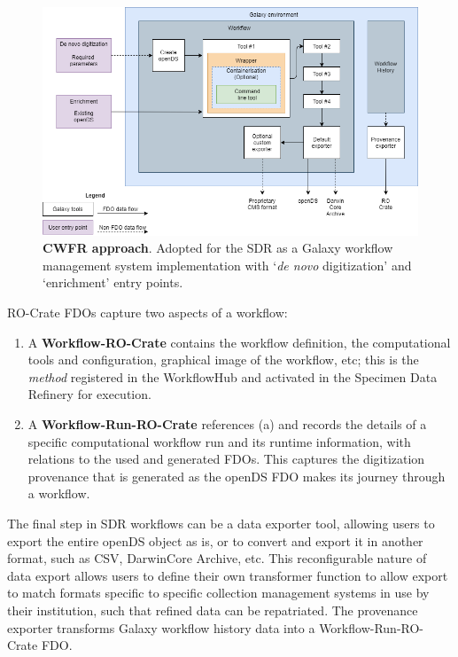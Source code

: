 \begin{figure}%
  \includegraphics[width=\textwidth]{figures/ch08/figure2.png}
	\caption[CWFR approach]{\textbf{CWFR approach}. Adopted for the SDR as a Galaxy 
  workflow management system
  implementation with `\emph{de novo} digitization' and `enrichment' entry points.}
  \label{ch8:figure2}
\end{figure}


RO-Crate FDOs capture two aspects of a workflow:

\begin{enumerate}
\item
  A \textbf{Workflow-RO-Crate} contains the workflow definition, the
  computational tools and configuration, graphical image of the
  workflow, etc; this is the \emph{method} registered in the WorkflowHub
  and activated in the Specimen Data Refinery for execution.
\item
  A \textbf{Workflow-Run-RO-Crate} references (a) and records the
  details of a specific computational workflow run and its runtime
  information, with relations to the used and generated FDOs. This
  captures the digitization provenance that is generated as the openDS
  FDO makes its journey through a workflow.
\end{enumerate}

The final step in SDR workflows can be a data exporter tool, allowing
users to export the entire openDS object as is, or to convert and export
it in another format, such as CSV, DarwinCore Archive, etc. This
reconfigurable nature of data export allows users to define their own
transformer function to allow export to match formats specific to
specific collection management systems in use by their institution, such
that refined data can be repatriated. The provenance exporter transforms
Galaxy workflow history data into a Workflow-Run-RO-Crate FDO.

